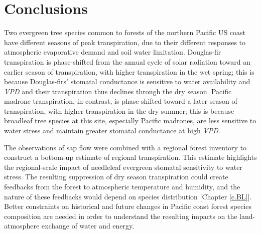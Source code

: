 \section{Conclusions}
Two evergreen tree species common to forests of the northern Pacific US coast have different seasons of peak transpiration, due to their different responses to atmospheric evaporative demand and soil water limitation.  Douglas-fir transpiration is phase-shifted from the annual cycle of solar radiation toward an earlier season of transpiration, with higher transpiration in the wet spring; this is because Douglas-firs' stomatal conductance is sensitive to water availability and \textit{VPD} and their transpiration thus declines through the dry season.  Pacific madrone transpiration, in contrast, is phase-shifted toward a later season of transpiration, with higher transpiration in the dry summer; this is because broadleaf tree species at this site, especially Pacific madrones, are less sensitive to water stress and maintain greater stomatal conductance at high \textit{VPD}.

The observations of sap flow were combined with a regional forest inventory to construct a bottom-up estimate of regional transpiration.  This estimate highlights the regional-scale impact of needleleaf evergreen stomatal sensitivity to water stress.  The resulting suppression of dry season transpiration could create feedbacks from the forest to atmospheric temperature and humidity, and the nature of these feedbacks would depend on species distribution [Chapter \ref{c.BL}].  Better constraints on historical and future changes in Pacific coast forest species composition are needed in order to understand the resulting impacts on the land-atmosphere exchange of water and energy.
